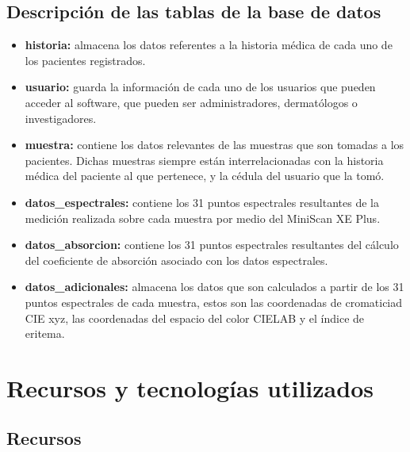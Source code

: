 	\subsection{Descripci\'{o}n de las tablas de la base de datos}
	
		\begin{itemize}
				
				\item \textbf{historia:} almacena los datos referentes a la historia m\'{e}dica de cada uno de los pacientes registrados.
				
				\item \textbf{usuario:} guarda la informaci\'{o}n de cada uno de los usuarios que pueden acceder al software, que pueden ser administradores, dermat\'{o}logos o investigadores.
				
				\item \textbf{muestra:} contiene los datos relevantes de las muestras que son tomadas a los pacientes. Dichas muestras siempre est\'{a}n interrelacionadas con la historia m\'{e}dica del paciente al que pertenece, y la c\'{e}dula del usuario que la tom\'{o}.

				\item \textbf{datos\_espectrales:} contiene los 31 puntos espectrales resultantes de la medici\'{o}n realizada sobre cada muestra por medio del MiniScan XE Plus.
				
				\item \textbf{datos\_absorcion:} contiene los 31 puntos espectrales resultantes del c\'{a}lculo del coeficiente de absorci\'{o}n asociado con los datos espectrales.
				
				\item \textbf{datos\_adicionales:} almacena los datos que son calculados a partir de los 31 puntos espectrales de cada muestra, estos son las coordenadas de cromaticiad CIE xyz, las coordenadas del espacio del color CIELAB y el \'{i}ndice de eritema.
				
		\end{itemize}

\section{Recursos y tecnolog\'{i}as utilizados}

	\subsection{Recursos}
	
